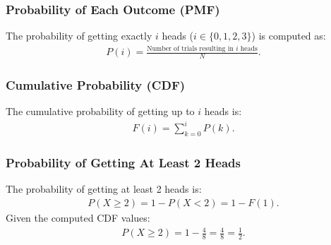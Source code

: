 \documentclass[article]{IEEEtran}
\numberwithin{figure}{enumi}
\begin{document}
\subsubsection*{Probability of Each Outcome (PMF)}
The probability of getting exactly $ i $ heads ($ i \in \{0, 1, 2, 3\} $) is computed as:
\begin{align}
P(i) = \frac{\text{Number of trials resulting in } i \text{ heads}}{N}.
\end{align}

\subsubsection*{Cumulative Probability (CDF)}
The cumulative probability of getting up to $ i $ heads is:
\begin{align}
F(i) = \sum_{k=0}^{i} P(k).
\end{align}

\subsubsection*{Probability of Getting At Least 2 Heads}
The probability of getting at least 2 heads is:
\begin{align}
P(X \geq 2) = 1 - P(X < 2) = 1 - F(1).
\end{align}
Given the computed CDF values:
\begin{align}
P(X \geq 2) = 1 - \frac{4}{8} = \frac{4}{8} = \frac{1}{2}.
\end{align}
\end{document}

